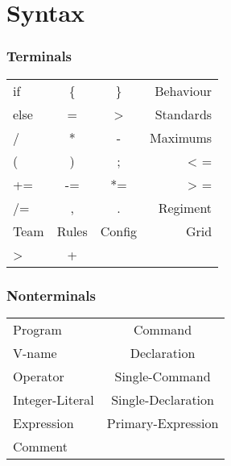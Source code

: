 \section{Syntax}
	\subsubsection{Terminals}
		
		\begin{tabular}{ l c c r}
			if   & \{ 	 & \} 	  & Behaviour  \\
		  	else &  = 	 & >  	  & Standards  \\
		 	/ 	 & *  	 & -  	  & Maximums   \\
		 	( 	 & )  	 & ;  	  & < =		   \\
		 	+= 	 & -=    & *= 	  & > =		   \\
		 	/= 	 & ,     & .  	  & Regiment   \\
			Team & Rules & Config & Grid	   \\
			>	 &   + 	 &		  &			   \\
		\end{tabular}
	\subsubsection{Nonterminals}
		\begin{tabular}{l c}
			Program	 		& Command			  \\
			V-name	 		& Declaration		  \\
			Operator	    & Single-Command	  \\
			Integer-Literal	& Single-Declaration  \\
			Expression		& Primary-Expression  \\
			Comment			&
		\end{tabular}